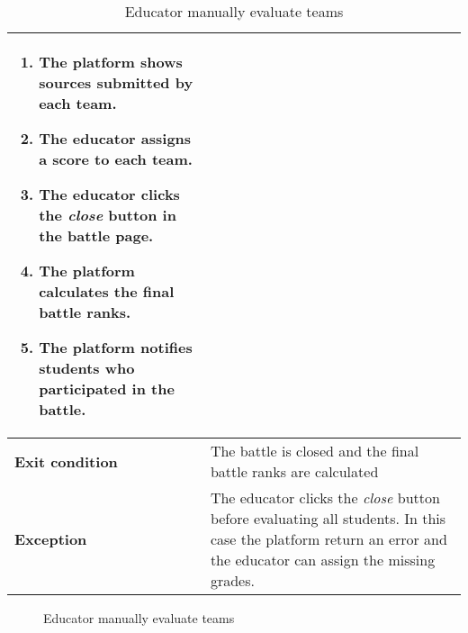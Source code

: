 \begin{enumerate}[label=\textbf{UC\arabic*}:,leftmargin=1.3cm]
\begin{table}[H]
\begin{tabular}{|l|p{11.9cm}|}
\begin{enumerate}[label=\arabic*.]
                              \item The platform shows sources submitted by each team.
                              \item The educator assigns a score to each team.
                              \item The educator clicks the \emph{close} button in the battle page.
                              \item The platform calculates the final battle ranks.
                              \item The platform notifies students who participated in the battle.
                        \end{enumerate}                 \\\hline
                        \textbf{Exit condition}  & The battle is closed and the final battle ranks are calculated                                                        \\\hline
                        \textbf{Exception}       & The educator clicks the \emph{close} button before evaluating all students.
                        In this case the platform return an error and the educator can assign the missing grades.              \\\hline
                  \end{tabular}
                  \caption{Educator manually evaluate teams    }
                  \label{table:Educator manually evaluate teams    }
            \end{table}

            \begin{figure}[H]
                  \centering
                  \caption{Educator manually evaluate teams    }
                  \label{fig:Educator manually evaluate teams    }
            \end{figure}

            \pagebreak


\end{enumerate}
